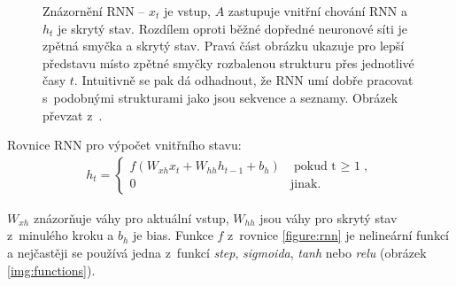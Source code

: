 \begin{figure}[H]
    \begin{center}
    \end{center}
	\caption{Znázornění RNN -- $x_t$ je vstup, $A$ zastupuje vnitřní chování RNN a $h_t$ je skrytý stav. Rozdílem oproti běžné dopředné neuronové síti je zpětná smyčka a skrytý stav. Pravá část obrázku ukazuje pro lepší představu místo zpětné smyčky rozbalenou strukturu přes jednotlivé časy $t$. Intuitivně se pak dá odhadnout, že RNN umí dobře pracovat s~podobnými strukturami jako jsou sekvence a seznamy. Obrázek převzat z~\cite{understandingLSTM}.}	
	\label{img:rnn}
\end{figure}

Rovnice RNN pro výpočet vnitřního stavu:
\begin{align}\label{figure:rnn}
  h_t = \begin{cases}
          f(W_{xh}x_t + W_{hh}h_{t-1} + b_h) & \mbox{pokud t $\geq$ 1}, \\
          0 & \mbox{jinak}.
        \end{cases}
\end{align}


$W_{xh}$ znázorňuje váhy pro aktuální vstup, $W_{hh}$ jsou váhy pro skrytý stav z~minulého kroku a $b_h$ je bias. Funkce $f$ z~rovnice \ref{figure:rnn} je nelineární funkcí a nejčastěji se používá jedna z~funkcí \emph{step}, \emph{sigmoida}, \emph{tanh} nebo \emph{relu} (obrázek \ref{img:functions}).

